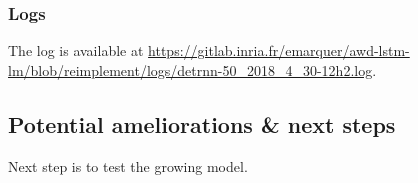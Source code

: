 \subsubsection{Logs}

The log is available at 
\href{https://gitlab.inria.fr/emarquer/awd-lstm-lm/blob/reimplement/logs/detrnn-50_2018_4_30-12h2.log}{https://gitlab.inria.fr/emarquer/awd-lstm-lm/blob/reimplement/logs/detrnn-50\_2018\_4\_30-12h2.log}.

\subsection{Potential ameliorations \& next steps}

Next step is to test the growing model.
